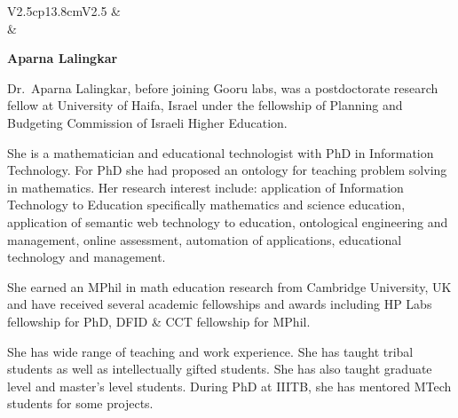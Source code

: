 \noindent
\begin{tabular}{V{2.5}cp{13.8cm}V{2.5}}
 &\\
 & 

\centerline{\large\bf Aparna Lalingkar}

\bigskip
Dr.~Aparna Lalingkar, before joining Gooru labs, was a postdoctorate research fellow at University of Haifa, Israel under the fellowship of Planning and Budgeting Commission of Israeli Higher Education.

\medskip

She is a mathematician and educational technologist with PhD in Information Technology. For PhD she had proposed an ontology for teaching problem solving in mathematics. Her research interest include: application of Information Technology to Education specifically mathematics and science education, application of semantic web technology to education, ontological engineering and management, online assessment, automation of applications, educational technology and management.

\medskip

She earned an MPhil in math education research from Cambridge University, UK and have received several academic fellowships and awards including HP Labs fellowship for PhD, DFID \& CCT fellowship for MPhil.

\medskip

She has wide range of teaching and work experience. She has taught tribal students as well as intellectually gifted students. She has also taught graduate level and master’s level students. During PhD at IIITB, she has mentored MTech students for some projects.\\


\end{tabular}
